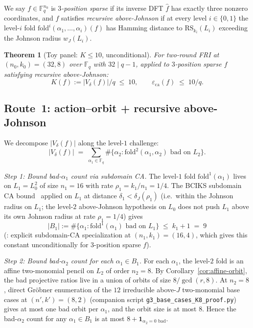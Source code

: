 \documentclass[11pt]{article}
\newtheorem{theorem}{Theorem}[section]
\theoremstyle{definition}
\theoremstyle{remark}
\newcommand{\FF}{\mathbb{F}}
\newcommand{\RS}{\mathrm{RS}}
\begin{document}
We say $f \in \FF_q^{n_0}$ is \emph{$3$-position sparse} if its
inverse DFT $\hat f$ has exactly three nonzero coordinates, and $f$
satisfies \emph{recursive above-Johnson} if at every level
$i \in \{0, 1\}$ the level-$i$ fold
$\mathrm{fold}^i(\alpha_1, \ldots, \alpha_i)(f)$ has Hamming
distance to $\RS_{k_i}(L_i)$ exceeding the Johnson radius
$w_J(L_i)$.

\begin{theorem}[Toy panel: $K \leq 10$, unconditional]
\label{thm:toy}
For two-round FRI at $(n_0, k_0) = (32, 8)$ over $\FF_q$ with
$32 \mid q-1$, applied to $3$-position sparse $f$ satisfying
recursive above-Johnson:
\[
 K(f) := |V_\delta(f)|/q \;\leq\; 10,
 \qquad
 \varepsilon_{\mathrm{ca}}(f) \;\leq\; 10/q.
\]
\end{theorem}

\subsection{Route~1: action--orbit + recursive above-Johnson}

We decompose $|V_\delta(f)|$ along the level-$1$ challenge:
\[
 |V_\delta(f)| \;=\; \sum_{\alpha_1 \in \FF_q} \#\{\alpha_2 : \mathrm{fold}^2(\alpha_1, \alpha_2) \text{ bad on } L_2\}.
\]

\noindent\emph{Step 1: Bound bad-$\alpha_1$ count via subdomain CA.}
The level-$1$ fold $\mathrm{fold}^1(\alpha_1)$ lives on $L_1 = L_0^2$ of size
$n_1 = 16$ with rate $\rho_1 = k_1/n_1 = 1/4$. The BCIKS subdomain CA
bound~\cite[Theorem~1.5]{BCIKS} applied on $L_1$ at distance
$\delta_1 < \delta_J(\rho_1)$ (i.e.\ within the Johnson radius on $L_1$;
the level-$2$ above-Johnson hypothesis on $L_0$ does not push $L_1$
above its own Johnson radius at rate $\rho_1 = 1/4$) gives
\[
 |B_1| := \#\{\alpha_1 : \mathrm{fold}^1(\alpha_1) \text{ bad on } L_1\}
 \;\leq\; k_1 + 1 \;=\; 9
\]
(\cite{CompanionRepo}: explicit subdomain-CA
specialization at $(n_1, k_1) = (16, 4)$, which gives this constant
unconditionally for $3$-position sparse $f$).

\noindent\emph{Step 2: Bound bad-$\alpha_2$ count for each $\alpha_1 \in B_1$.}
For each $\alpha_1$, the level-$2$ fold is an affine two-monomial pencil on
$L_2$ of order $n_2 = 8$. By Corollary~\ref{cor:affine-orbit}, the bad
projective ratios live in a union of orbits of size $8 / \gcd(r, 8)$. At
$n_2 = 8$, direct Gr\"obner enumeration of the $12$ irreducible
above-$J$ two-monomial base cases at $(n', k') = (8, 2)$ (companion
script \texttt{g3\_base\_cases\_K8\_proof.py}) gives at most one bad orbit
per $\alpha_1$, and the orbit size is at most $8$. Hence the bad-$\alpha_2$
count for any $\alpha_1 \in B_1$ is at most $8 + \mathbf{1}_{\alpha_2 = 0\text{ bad}}$.
\end{document}
